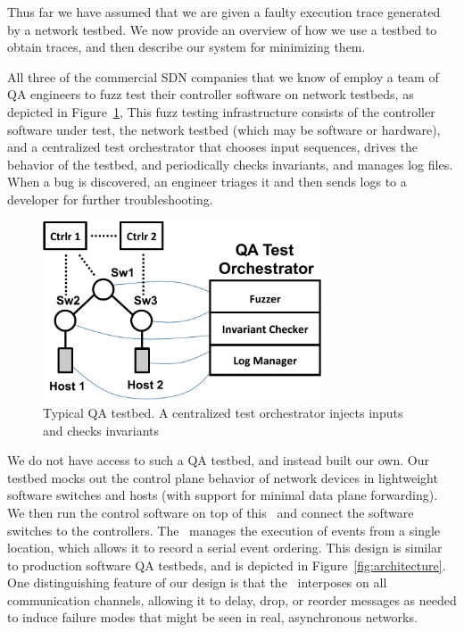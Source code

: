 
Thus far we have assumed that we are given a faulty execution
trace generated by a network testbed. We now provide an overview of
how we use a testbed to obtain traces, and then describe our system for
minimizing them.

 All three of the commercial SDN companies
that we know of employ a team of QA
engineers to fuzz test their controller software on network testbeds,
as depicted in Figure~\ref{fig:qa_cluster},
This fuzz testing infrastructure
consists of the controller software under test, the network testbed (which may
be software or hardware), and a centralized
test orchestrator
that chooses input sequences, drives the behavior of the testbed,
and periodically checks invariants, and manages log files. When a bug is discovered, an
engineer triages it and then sends logs to a developer for further troubleshooting.

\begin{figure}[tb]
    \centering
    \hspace{-10pt}
    \includegraphics[width=3.25in]{../diagrams/architecture/qa_cluster.pdf}
    \caption[]{\label{fig:qa_cluster} Typical QA testbed. A centralized test
    orchestrator injects inputs and checks invariants}
    \vspace{-1em}
\end{figure}

We do not have access to such a QA testbed, and instead built our own.
Our testbed mocks out the control plane
behavior of network devices in lightweight software switches and hosts (with
support for minimal data plane forwarding).
We then run the control software on
top of this \tester~and connect the software switches to the
controllers. The \tester~manages the execution of events from a single location,
which allows it to record a serial
event ordering. This design is similar to production software QA testbeds, and is
depicted in Figure~\ref{fig:architecture}. One distinguishing feature of our
design is that
the \tester~interposes on all communication
channels, allowing it to delay, drop, or reorder
messages as needed to induce failure modes that might be seen in
real, asynchronous networks.

